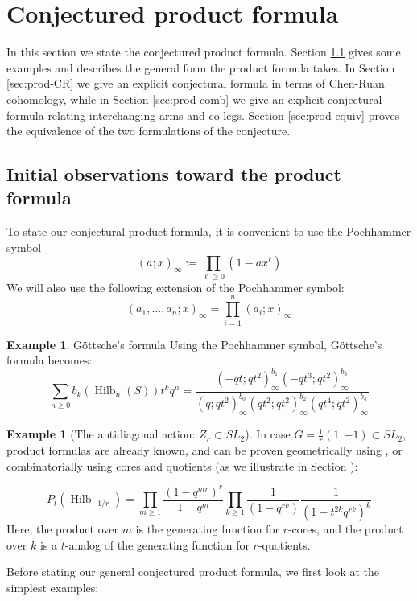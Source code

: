 \documentclass{amsart}[12pt]
\theoremstyle{definition}
\newtheorem{example}[dummy]{Example}
\DeclareMathOperator{\Hilb}{Hilb}
\begin{document}
\section{Conjectured product formula}

In this section we state the conjectured product formula.  Section \ref{sec:prod-start} gives some examples and describes the general form the product formula takes.  In Section \ref{sec:prod-CR} we give an explicit conjectural formula in terms of Chen-Ruan cohomology, while in Section \ref{sec:prod-comb} we give an explicit conjectural formula relating interchanging arms and co-legs.  Section \ref{sec:prod-equiv} proves the equivalence of the two formulations of the conjecture.


\subsection{Initial observations toward the product formula}
\label{sec:prod-start}

To state our conjectural product formula, it is convenient to use the Pochhammer symbol 
$$(a;x)_\infty:=\prod_{\ell\geq 0} (1-ax^\ell)$$
We will also use the following extension of the Pochhammer symbol:
$$(a_1,\dots, a_n; x)_\infty=\prod_{i=1}^n (a_i;x)_\infty$$

\begin{example}{G\"ottsche's formula}
Using the Pochhammer symbol, G\"ottsche's formula becomes:
$$\sum_{n\geq 0} b_k(\Hilb_n(S))t^kq^n=\frac{(-qt;qt^2)_\infty^{b_1}(-qt^3;qt^2)_\infty^{b_3}}{(q;qt^2)_\infty^{b_0}(qt^2;qt^2)_\infty^{b_2}(qt^4;qt^2)_\infty^{b_4}}$$
\end{example}

\begin{example}[The antidiagonal action: $Z_r\subset SL_2$] \label{ex:tcorequot}
In case $G=\frac{1}{r}(1,-1)\subset SL_2$, product formulas are already known, and can be proven geometrically using , or combinatorially using cores and quotients (as we illustrate in Section ):

$$P_t(\Hilb_{-1/r})=\prod_{m\geq 1} \frac{(1-q^{mr})^r}{1-q^m} \prod_{k\geq 1} \frac{1}{(1-q^{rk})}\frac{1}{(1-t^{2k}q^{rk})^k}$$
Here, the product over $m$ is the generating function for $r$-cores, and the product over $k$ is a $t$-analog of the generating function for $r$-quotients.
\end{example}

Before stating our general conjectured product formula, we first look at the simplest examples:
\end{document}
